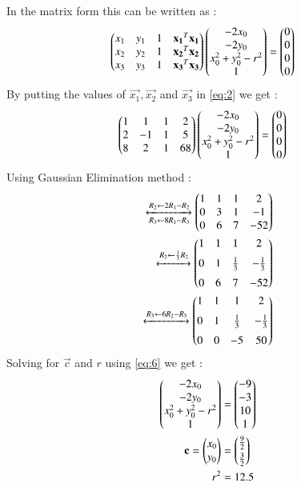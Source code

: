 \documentclass[journal,12pt,twocolumn]{IEEEtran}
\begin{document}
In the matrix form this can be written as : 
\begin{align}
 \begin{pmatrix}x_1&y_1&1&\mathbf{x_1}^T\mathbf{x_1}\\x_2&y_2&1&\mathbf{x_2}^T\mathbf{x_2}\\x_3&y_3&1&\mathbf{x_3}^T\mathbf{x_3}\end{pmatrix}\begin{pmatrix}-2x_0\\-2y_0\\x_0^2+y_0^2-r^2\\1\end{pmatrix}&=\begin{pmatrix}0\\0\\0\\0\end{pmatrix}\label{eq:2} 
\end{align}
By putting the values of $\vec{x_1},\vec{x_2}$ and $\vec{x_3}$ in \eqref{eq:2} we get :
\begin{align}
 \begin{pmatrix}1&1&1&2\\2&-1&1&5\\8&2&1&68\end{pmatrix}\begin{pmatrix}-2x_0\\-2y_0\\x_0^2+y_0^2-r^2\\1\end{pmatrix}&=\begin{pmatrix}0\\0\\0\\0\end{pmatrix} \label{eq:3}
\end{align}
Using Gaussian Elimination method :
\begin{align}
\xleftrightarrow[R_3 \leftarrow 8R_1-R_3]{R_2 \leftarrow 2R_1-R_2}\begin{pmatrix}1&1&1&2\\0&3&1&-1\\0&6&7&-52\end{pmatrix}\\
\xleftrightarrow{R_2 \leftarrow \frac{1}{3} R_2}\begin{pmatrix}1&1&1&2\\[0.2cm]0&1&\frac{1}{3}&-\frac{1}{3}\\[0.2cm]0&6&7&-52\end{pmatrix}\\
\xleftrightarrow{R_3 \leftarrow 6R_2-R_3}\begin{pmatrix}1&1&1&2\\[0.2cm]0&1&\frac{1}{3}&-\frac{1}{3}\\[0.2cm]0&0&-5&50\end{pmatrix}\label{eq:6}
\end{align}
Solving for $\vec{c}$ and $r$ using \eqref{eq:6} we get : 
\begin{align}
\begin{pmatrix}-2x_0\\-2y_0\\x_0^2+y_0^2-r^2\\1\end{pmatrix}&=\begin{pmatrix}-9\\-3\\10\\1\end{pmatrix}\\
\mathbf{c}=\begin{pmatrix}x_0\\y_0\end{pmatrix}&=\begin{pmatrix}\frac{9}{2}\\[0.1cm]\frac{3}{2}\end{pmatrix}\\
r^2&=12.5   
\end{align}
\end{document}
